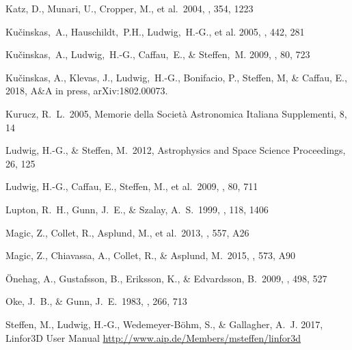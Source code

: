 \documentclass[]{aa}
\newcommand{\linfor}{Linfor3D}
\begin{document}
\begin{thebibliography}{}
 Katz, D., Munari, U., Cropper, M., et al.\ 2004, \mnras, 354, 1223 

Ku\v{c}inskas,~A., Hauschildt,~P.H., Ludwig,~H.-G., et al.
2005, \aap, 442, 281

Ku\v{c}inskas,~A., Ludwig,~H.-G., Caffau,~E., \& Steffen,~M.
2009, \memsai, 80, 723

Ku\v{c}inskas, A., Klevas, J., Ludwig,~H.-G., Bonifacio, P., Steffen, M, \& Caffau, E.,
2018, A\&A in press, arXiv:1802.00073.

 Kurucz, R.~L.\ 2005, Memorie della Societ\`a Astronomica Italiana Supplementi, 8, 14 

 Ludwig, H.-G., \& Steffen, M.\ 2012, Astrophysics and Space Science Proceedings, 26, 125 

 Ludwig, H.-G., Caffau, E., Steffen, M., et al.\ 2009, \memsai, 80, 711 

 Lupton, R.~H., Gunn, J.~E., \& Szalay, A.~S.\ 1999, \aj, 118, 1406 


 Magic, Z., Collet, R., Asplund, M., et al.\ 2013, \aap, 557, A26 

 Magic, Z., Chiavassa, A., Collet, R., \& Asplund, M.\ 2015, \aap, 573, A90 

 {\"O}nehag, A., Gustafsson, B., Eriksson, K., \& Edvardsson, B.\ 2009, \aap, 498, 527 

 Oke, J.~B., \& Gunn, J.~E.\ 1983, \apj, 266, 713 

{Steffen}, M., {Ludwig}, H.-G., {Wedemeyer-B{\"o}hm}, S., \& {Gallagher}, A.~J.
  2017, \linfor{} User Manual
  \url{http://www.aip.de/Members/msteffen/linfor3d}







\end{thebibliography}
\end{document}
